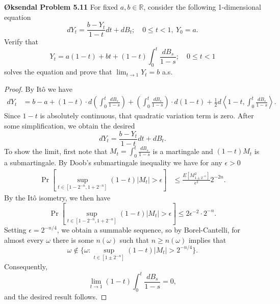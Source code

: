 \documentclass[11pt,letterpaper]{report}
\newcommand{\reals}{\mathbb{R}}
\begin{document}
\noindent\textbf{\O ksendal Problem 5.11 }
For fixed $a,b\in \reals$, consider the following 1-dimensional equation
\[
dY_t = \frac{b-Y_t}{1-t}dt + dB_t;\quad 0\leq t<1,\ Y_0 = a.
\]
Verify that
\[
Y_t = a(1-t) + bt + (1-t)\int_0^t\frac{dB_s}{1-s};\quad 0\leq t<1
\]
solves the equation and prove that $\lim_{t\to 1}Y_t = b$ a.s.
\begin{proof}
	By It\^o we have
	\begin{align*}
	dY_t &= b-a + (1-t)\cdot d\left(\int_0^t\frac{dB_s}{1-s}\right) + \left(\int_0^t\frac{dB_s}{1-s}\right)\cdot d(1-t) + \frac{1}{2}d\left\langle 1-t, \int_0^t\frac{dB_s}{1-s}\right\rangle.
	\end{align*}
	Since $1-t$ is absolutely continuous, that quadratic variation term is zero. After some simplification, we obtain the desired
	\[
	dY_t = \frac{b-Y_t}{1-t}dt + dB_t.
	\]
	To show the limit, first note that $M_t = \int_0^t\frac{dB_s}{1-s}$ is a martingale and $(1-t)M_t$ is a submartingale. By Doob's submartingale inequality we have for any $\epsilon>0$
	\begin{align*}
		\Pr[\sup_{t\in [1-2^{-n}, 1+2^{-n}]}(1-t)|M_t|>\epsilon] &\leq \frac{E[M_{1\pm 2^{-n}}^2]}{\epsilon^2}2^{-2n}.
	\end{align*}
	By the It\^o isometry, we then have
	\[
	\Pr[\sup_{t\in [1-2^{-n}, 1+2^{-n}]}(1-t)|M_t|>\epsilon] \leq 2\epsilon^{-2}\cdot 2^{-n}.
	\]
	Setting $\epsilon = 2^{-n/4}$, we obtain a summable sequence, so by Borel-Cantelli, for almost every $\omega$ there is some $n(\omega)$ such that $n\geq n(\omega)$ implies that
	\[
	\omega\notin \{\omega: \sup_{t\in [1\pm 2^{-n}]}(1-t)|M_t| > 2^{-n/4}\}.
	\]
	Consequently,
	\[
	\lim_{t\to 1}(1-t)\int_0^t\frac{dB_s}{1-s} = 0,
	\]
	and the desired result follows.
\end{proof}
\end{document}
